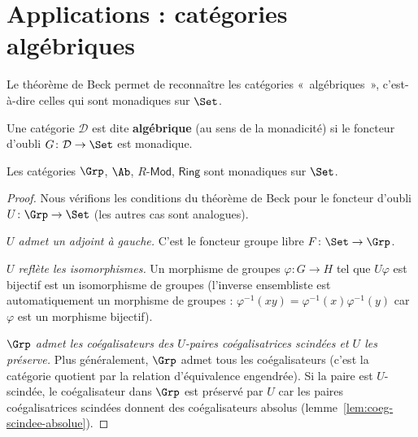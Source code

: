 

\section{Applications : catégories algébriques}\label{sec:categories-algebriques}

Le théorème de Beck permet de reconnaître les catégories
«~algébriques~», c'est-à-dire celles qui sont monadiques sur $\Set$.

\begin{definition}\label{def:categorie-algebrique}
Une catégorie $\mathcal{D}$ est dite \textbf{algébrique} (au sens de
la monadicité) si le foncteur d'oubli $G \colon \mathcal{D} \to \Set$
est monadique.
\end{definition}

\begin{corollaire}\label{cor:grp-monadique}
Les catégories $\Grp$, $\Ab$, $R\text{-}\mathsf{Mod}$,
$\mathsf{Ring}$ sont monadiques sur $\Set$.
\end{corollaire}

\begin{proof}
Nous vérifions les conditions du théorème de Beck pour le foncteur
d'oubli $U \colon \Grp \to \Set$ (les autres cas sont analogues).

\emph{$U$ admet un adjoint à gauche.}
C'est le foncteur groupe libre $F \colon \Set \to \Grp$.

\emph{$U$ reflète les isomorphismes.}
Un morphisme de groupes $\varphi \colon G \to H$ tel que $U\varphi$
est bijectif est un isomorphisme de groupes (l'inverse ensembliste
est automatiquement un morphisme de groupes :
$\varphi^{-1}(xy) = \varphi^{-1}(x)\varphi^{-1}(y)$
car $\varphi$ est un morphisme bijectif).

\emph{$\Grp$ admet les coégalisateurs des $U$-paires coégalisatrices
scindées et $U$ les préserve.}
Plus généralement, $\Grp$ admet tous les coégalisateurs
(c'est la catégorie quotient par la relation d'équivalence engendrée).
Si la paire est $U$-scindée, le coégalisateur dans $\Grp$
est préservé par $U$ car les paires coégalisatrices scindées
donnent des coégalisateurs absolus
(lemme~\ref{lem:coeg-scindee-absolue}).
\end{proof}

